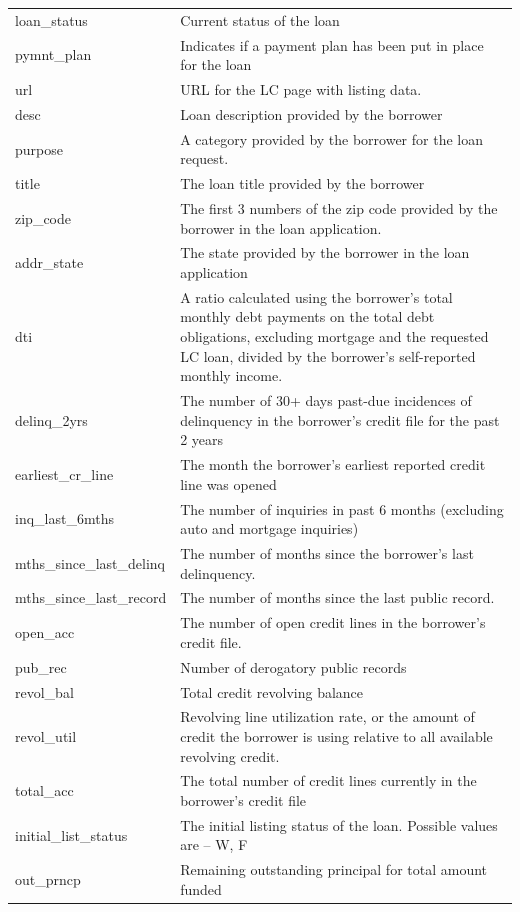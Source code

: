 \documentclass[11pt,]{report}
\begin{document}
\begin{longtable}[t]{>{\raggedright\arraybackslash}p{7cm}>{\raggedright\arraybackslash}p{7cm}}
loan\_status & Current status of the loan\\
\addlinespace
pymnt\_plan & Indicates if a payment plan has been put in place for the loan\\
url & URL for the LC page with listing data.\\
desc & Loan description provided by the borrower\\
purpose & A category provided by the borrower for the loan request.\\
title & The loan title provided by the borrower\\
\addlinespace
zip\_code & The first 3 numbers of the zip code provided by the borrower in the loan application.\\
addr\_state & The state provided by the borrower in the loan application\\
dti & A ratio calculated using the borrower’s total monthly debt payments on the total debt obligations, excluding mortgage and the requested LC loan, divided by the borrower’s self-reported monthly income.\\
delinq\_2yrs & The number of 30+ days past-due incidences of delinquency in the borrower's credit file for the past 2 years\\
earliest\_cr\_line & The month the borrower's earliest reported credit line was opened\\
\addlinespace
inq\_last\_6mths & The number of inquiries in past 6 months (excluding auto and mortgage inquiries)\\
mths\_since\_last\_delinq & The number of months since the borrower's last delinquency.\\
mths\_since\_last\_record & The number of months since the last public record.\\
open\_acc & The number of open credit lines in the borrower's credit file.\\
pub\_rec & Number of derogatory public records\\
\addlinespace
revol\_bal & Total credit revolving balance\\
revol\_util & Revolving line utilization rate, or the amount of credit the borrower is using relative to all available revolving credit.\\
total\_acc & The total number of credit lines currently in the borrower's credit file\\
initial\_list\_status & The initial listing status of the loan. Possible values are – W,
  F\\
out\_prncp & Remaining outstanding principal for total amount funded\\

\end{longtable}
\end{document}
